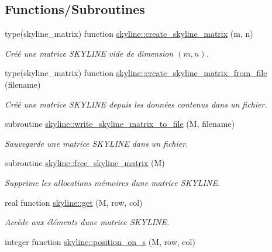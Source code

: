 \subsection*{Functions/\+Subroutines}
\begin{DoxyCompactItemize}
\item 
type(skyline\+\_\+matrix) function \hyperlink{namespaceskyline_a5fe1d351df2e3a07f96028d1d2a892a8}{skyline\+::create\+\_\+skyline\+\_\+matrix} (m, n)
\begin{DoxyCompactList}\small\item\em Créé une matrice S\+K\+Y\+L\+I\+NE vide de dimension $(m,n)$. \end{DoxyCompactList}\item 
type(skyline\+\_\+matrix) function \hyperlink{namespaceskyline_a86a4fe28bc106ef42d25cf7596c108bf}{skyline\+::create\+\_\+skyline\+\_\+matrix\+\_\+from\+\_\+file} (filename)
\begin{DoxyCompactList}\small\item\em Créé une matrice S\+K\+Y\+L\+I\+NE depuis les données contenus dans un fichier. \end{DoxyCompactList}\item 
subroutine \hyperlink{namespaceskyline_a3377a8391ad2d61659689fc8c4130bdc}{skyline\+::write\+\_\+skyline\+\_\+matrix\+\_\+to\+\_\+file} (M, filename)
\begin{DoxyCompactList}\small\item\em Sauvegarde une matrice S\+K\+Y\+L\+I\+NE dans un fichier. \end{DoxyCompactList}\item 
subroutine \hyperlink{namespaceskyline_a583c70b26e3bcb37ecb679f5c11ec2f4}{skyline\+::free\+\_\+skyline\+\_\+matrix} (M)
\begin{DoxyCompactList}\small\item\em Supprime les allocations mémoires d\textquotesingle{}une matrice S\+K\+Y\+L\+I\+NE. \end{DoxyCompactList}\item 
real function \hyperlink{namespaceskyline_a28077ec6714b830771f90da1b674b0ce}{skyline\+::get} (M, row, col)
\begin{DoxyCompactList}\small\item\em Accède aux éléments d\textquotesingle{}une matrice S\+K\+Y\+L\+I\+NE. \end{DoxyCompactList}\item 
integer function \hyperlink{namespaceskyline_a25b1e027d99abb67ab844d7b657a5843}{skyline\+::position\+\_\+on\+\_\+s} (M, row, col)

\end{DoxyCompactItemize}
